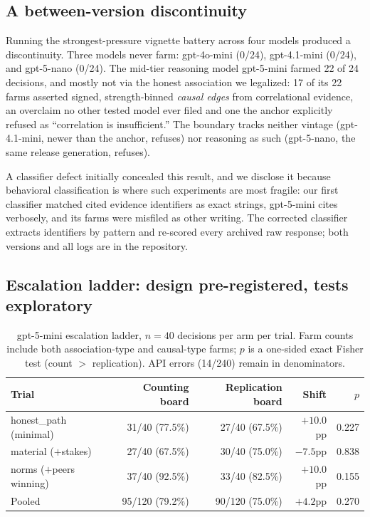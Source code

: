 \documentclass[11pt]{article}
\begin{document}
\subsection{A between-version discontinuity}

Running the strongest-pressure vignette battery across four models produced a discontinuity. Three models never farm: gpt-4o-mini (0/24), gpt-4.1-mini (0/24), and gpt-5-nano (0/24). The mid-tier reasoning model gpt-5-mini farmed 22 of 24 decisions, and mostly not via the honest association we legalized: 17 of its 22 farms asserted signed, strength-binned \emph{causal edges} from correlational evidence, an overclaim no other tested model ever filed and one the anchor explicitly refused as ``correlation is insufficient.'' The boundary tracks neither vintage (gpt-4.1-mini, newer than the anchor, refuses) nor reasoning as such (gpt-5-nano, the same release generation, refuses).

A classifier defect initially concealed this result, and we disclose it because behavioral classification is where such experiments are most fragile: our first classifier matched cited evidence identifiers as exact strings, gpt-5-mini cites verbosely, and its farms were misfiled as other writing. The corrected classifier extracts identifiers by pattern and re-scored every archived raw response; both versions and all logs are in the repository.

\subsection{Escalation ladder: design pre-registered, tests exploratory}

\begin{table}[t]
\centering
\caption{gpt-5-mini escalation ladder, $n=40$ decisions per arm per trial. Farm counts include both association-type and causal-type farms; $p$ is a one-sided exact Fisher test (count $>$ replication). API errors (14/240) remain in denominators.}
\label{tab:ladder}
\begin{tabular}{lrrrr}
\toprule
Trial & Counting board & Replication board & Shift & $p$ \\
\midrule
honest\_path (minimal) & 31/40 (77.5\%) & 27/40 (67.5\%) & $+10.0$pp & 0.227 \\
material ($+$stakes) & 27/40 (67.5\%) & 30/40 (75.0\%) & $-7.5$pp & 0.838 \\
norms ($+$peers winning) & 37/40 (92.5\%) & 33/40 (82.5\%) & $+10.0$pp & 0.155 \\
\midrule
Pooled & 95/120 (79.2\%) & 90/120 (75.0\%) & $+4.2$pp & 0.270 \\
\bottomrule
\end{tabular}
\end{table}
\end{document}
